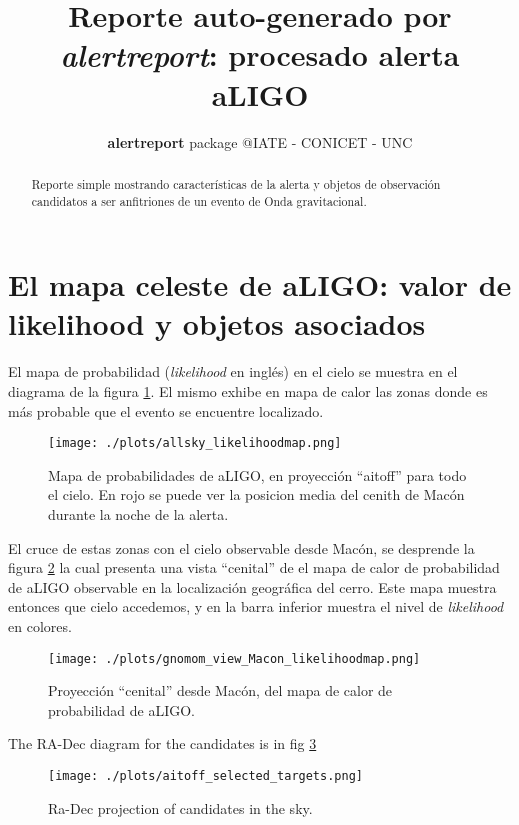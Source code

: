 \documentclass[a4paper,10pt]{article}
\title{Reporte auto-generado por \textit{alertreport}: procesado alerta aLIGO}
\author{\textbf{alertreport} package @IATE - CONICET - UNC}
\begin{document}
\maketitle

\begin{abstract}
Reporte simple mostrando caracter\'{i}sticas de la alerta y objetos de observaci\'on 
candidatos a ser anfitriones de un evento de Onda gravitacional.
\end{abstract}

\section{El mapa celeste de aLIGO: valor de likelihood y objetos asociados}
El mapa de probabilidad (\textit{likelihood} en ingl\'es) en el cielo se muestra en el diagrama
de la figura \ref{fig:aitoff_likelihood_map}. El mismo exhibe en mapa de calor las zonas donde es 
m\'as probable que el evento se encuentre localizado.

\begin{figure}
 \centering
 \texttt{[image: ./plots/allsky\_likelihoodmap.png]}
 \caption{Mapa de probabilidades de aLIGO, en proyecci\'on ``aitoff'' para todo el cielo.
 En rojo se puede ver la posicion media del cenith de Mac\'on durante la noche de la alerta.}
 \label{fig:aitoff_likelihood_map}
\end{figure}

El cruce de estas zonas con el cielo observable desde Mac\'on, se desprende la figura 
\ref{fig:gnomom_view_Macon_likelihoodmap} la cual presenta una vista ``cenital'' de el 
mapa de calor de probabilidad de aLIGO observable en la localizaci\'on geogr\'afica del cerro.
Este mapa muestra entonces que cielo accedemos, y en la barra inferior muestra el nivel de 
\textit{likelihood} en colores.

\begin{figure}
 \centering
 \texttt{[image: ./plots/gnomom\_view\_Macon\_likelihoodmap.png]}
 \caption{Proyecci\'on ``cenital'' desde Mac\'on, del mapa de calor de probabilidad de aLIGO.}
 \label{fig:gnomom_view_Macon_likelihoodmap}
\end{figure}



\begin{landscape}
\begin{small}

\end{small}

\end{landscape}

The RA-Dec diagram for the candidates is in fig \ref{fig:candidatesRA-Dec}
\begin{figure}
 \centering
 \texttt{[image: ./plots/aitoff\_selected\_targets.png]}
 \caption{Ra-Dec projection of candidates in the sky.}
 \label{fig:candidatesRA-Dec}
\end{figure}
\end{document}
